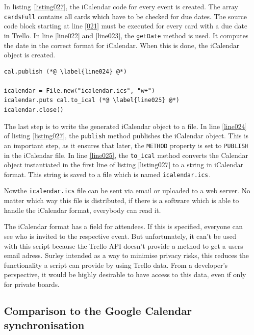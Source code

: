 In listing \ref{listing027}, the iCalendar code for every event is created. The array \lstinline{cardsFull} contains all cards which have to be checked for due dates. The source code block starting at line \ref{021} must be executed for every card with a due date in Trello. In line \ref{line022} and \ref{line023}, the \lstinline{getDate} method is used. It computes the date in the correct format for iCalendar. When this is done, the iCalendar object is created. 

\begin{lstlisting}[aboveskip=1\baselineskip, style=bash, caption=Saving the iCalendar file., label=listing027]
cal.publish (*@ \label{line024} @*)

icalendar = File.new("icalendar.ics", "w+")
icalendar.puts cal.to_ical (*@ \label{line025} @*)
icalendar.close()
\end{lstlisting}

The last step is to write the generated iCalendar object to a file. In line \ref{line024} of listing \ref{listing027}, the \lstinline{publish} method publishes the iCalendar object. This is an important step, as it ensures that later, the \lstinline{METHOD} property is set to \lstinline{PUBLISH} in the iCalendar file. In line \ref{line025}, the \lstinline{to_ical} method converts the Calendar object instantiated in the first line of listing \ref{listing027} to a string in iCalendar format. This string is saved to a file which is named \lstinline{icalendar.ics}. \cite{ical:gemdocu}

Now\komma the \lstinline{icalendar.ics} file can be sent via email or uploaded to a web server. No matter which way this file is distributed, if there is a software which is able to handle the iCalendar format, everybody can read it.

The iCalendar format has a field for attendees. If this is specified, everyone can see who is invited to the respective event. But unfortunately, it can't be used with this script because the Trello API doesn't provide a method to get a users email adress. Surley intended as a way to minimise privacy risks, this reduces the functionality a script can provide by using Trello data. From a developer's perspective, it would be highly desirable to have access to this data, even if only for private boards.

\subsection{Comparison to the Google Calendar synchronisation} 

